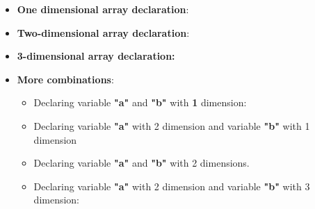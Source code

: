 \setlength{\columnsep}{3pt}
\begin{flushleft}
	\begin{itemize}
		\item \textbf{One dimensional array declaration}:
		\bigskip
		\bigskip
		
		\bigskip
		\item \textbf{Two-dimensional array declaration}:
		\bigskip
		
		
		
		\item \textbf{3-dimensional array declaration:}
		\bigskip
		
		\bigskip		
		\item \textbf{More combinations}:
		\begin{itemize}
			\item Declaring variable \textbf{"a"} and \textbf{"b"} with \textbf{1} dimension:
			\bigskip
			\bigskip
			\item Declaring variable \textbf{"a"} with 2 dimension and variable \textbf{"b"} with 1 dimension
			\bigskip
			
			\item Declaring variable \textbf{"a"} and \textbf{"b"} with 2 dimensions.
			\bigskip
			
			\item Declaring variable \textbf{"a"} with 2 dimension and variable \textbf{"b"} with 3 dimension:
			
			\bigskip
			
		\end{itemize}
		
	\end{itemize}
	
	
	
\end{flushleft}

\newpage




